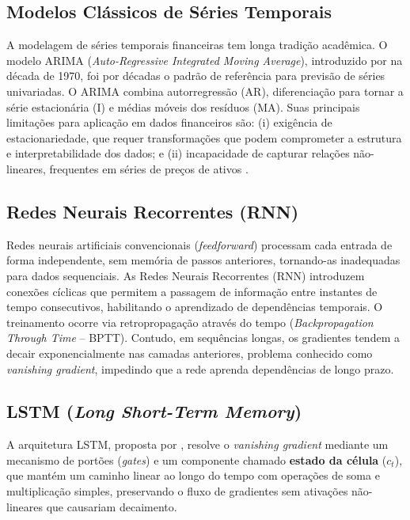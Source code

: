 \documentclass[12pt]{article}
\begin{document}
\subsection{Modelos Clássicos de Séries Temporais}

A modelagem de séries temporais financeiras tem longa tradição acadêmica. O
modelo ARIMA (\textit{Auto-Regressive Integrated Moving Average}), introduzido
por \cite{box:1970} na década de 1970, foi por décadas o padrão de referência
para previsão de séries univariadas. O ARIMA combina
autorregressão (AR), diferenciação para tornar a série estacionária (I) e
médias móveis dos resíduos (MA). Suas principais limitações para aplicação
em dados financeiros são: (i) exigência de estacionariedade, que requer
transformações que podem comprometer a estrutura e interpretabilidade dos
dados; e (ii) incapacidade de capturar relações não-lineares, frequentes em
séries de preços de ativos \cite{nascimento:2022}.

\subsection{Redes Neurais Recorrentes (RNN)}

Redes neurais artificiais convencionais (\textit{feedforward}) processam cada
entrada de forma independente, sem memória de passos anteriores, tornando-as
inadequadas para dados sequenciais. As Redes Neurais Recorrentes (RNN)
introduzem conexões cíclicas que permitem a passagem de informação entre
instantes de tempo consecutivos, habilitando o aprendizado de dependências
temporais. O treinamento ocorre via retropropagação através do tempo
(\textit{Backpropagation Through Time} -- BPTT). Contudo, em sequências longas,
os gradientes tendem a decair exponencialmente nas camadas anteriores, problema conhecido como \textit{vanishing gradient}, impedindo que a rede
aprenda dependências de longo prazo.

\subsection{LSTM (\textit{Long Short-Term Memory})}

A arquitetura LSTM, proposta por \cite{hochreiter:1997}, resolve o
\textit{vanishing gradient} mediante um mecanismo de portões (\textit{gates})
e um componente chamado \textbf{estado da célula} ($c_t$), que mantém um
caminho linear ao longo do tempo com operações de soma e multiplicação simples,
preservando o fluxo de gradientes sem ativações não-lineares que causariam
decaimento.
\end{document}
